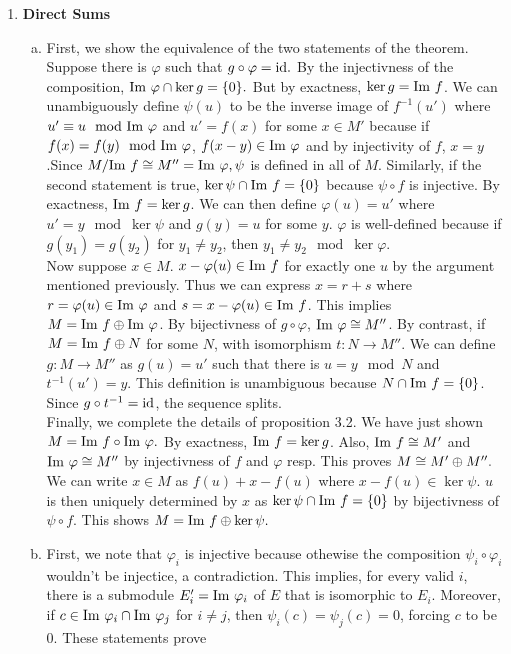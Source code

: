 \documentclass{article}
\theoremstyle{definition}
\theoremstyle{remark}
\begin{document}
\begin{enumerate}[(1)]
   
    \item  \textbf{Direct Sums}
    \begin{enumerate}[(a)]
        \item  First, we show the equivalence of the two statements of the theorem. Suppose there is $\varphi$ such that $g \circ \varphi = \text{id}.$ By the injectivness of the composition,  $\mathrm{Im}\  \varphi \cap \ker g  = \{0\}.$ But by exactness, $\ker g = \mathrm{Im}\  f$. We can unambiguously define $\psi(u)$ to be the inverse image of $f^{-1}(u')$ where $u' \equiv u \mod {\mathrm{Im}\ } \varphi$ and $u' = f(x)$ for some $x \in M'$ because if $f(x) = f(y) \mod {\mathrm{Im}\ } \varphi$, $f(x - y) \in \mathrm{Im}\  \varphi$ and by injectivity of $f$, $x = y$.Since $M/\mathrm{Im}\  f \cong M'' =  \mathrm{Im}\  \varphi, \psi$ is defined in all of $M$. Similarly, if the second statement is true, $\ker \psi \cap \mathrm{Im}\  f = \{0\}$ because $\psi\circ f$ is injective. By exactness, $\mathrm{Im}\  f = \ker g$. We can then define $\varphi(u) = u'$ where $u' = y \mod \ker \psi$ and $g(y) = u$ for some $y$. $\varphi$ is well-defined because if $g(y_1) = g(y_2)$ for $y_1 \neq y_2$, then $y_1 \neq y_2 \mod \ker \varphi$.\\
        
        Now suppose $x \in M$. $x - \varphi(u) \in \mathrm{Im}\  f$ for exactly one $u$ by the argument mentioned previously. Thus we can express $x = r + s$ where $r = \varphi(u) \in \mathrm{Im}\  \varphi$ and $s = x - \varphi(u) \in \mathrm{Im}\  f$. This implies $M = \mathrm{Im}\  f \oplus \mathrm{Im}\  \varphi$. By bijectivness of $g \circ \varphi$, $\mathrm{Im}\  \varphi \cong M''$. By contrast, if $M = \mathrm{Im}\  f \oplus N$ for some $N$, with isomorphism $t: N \to M''.$ We can define $g: M \to M''$ as $g(u) = u'$ such that there is $u = y \mod N$ and $t^{-1}(u') = y$. This definition is unambiguous because $N \cap \mathrm{Im}\  f = \{0\}$. Since $g \circ t^{-1} = \text{id}$, the sequence splits.\\



        Finally, we complete the details of proposition 3.2. We have just shown $M = \mathrm{Im}\  f \circ \mathrm{Im}\  \varphi.$ By exactness, $\mathrm{Im}\  f = \ker g$. Also, $\mathrm{Im}\  f \cong M'$ and $\mathrm{Im}\  \varphi \cong M''$ by injectivness of $f$ and $\varphi$ resp. This proves $M \cong M' \oplus M''.$ We can write $x \in M$ as $f(u) + x - f(u)$ where $x - f(u) \in \ker \psi$. $u$ is then uniquely determined by $x$ as $\ker \psi \cap \mathrm{Im}\  f = \{0\}$ by bijectivness of $\psi \circ f.$ This shows $M = \mathrm{Im}\  f \oplus \ker \psi.$

        \renewcommand{\phi}{\varphi}
        \item First, we note that $\phi_i$ is injective because othewise the composition $\psi_i \circ \phi_i$ wouldn't be injectice, a contradiction. This implies, for every valid $i$, there is a submodule $E'_i = \Img \phi_i$ of $E$ that is isomorphic to $E_i.$ Moreover, if $c \in \Img \phi_i \cap \Img \phi_j$ for $i\neq j$, then $\psi_i(c) = \psi_j(c) = 0$, forcing $c$ to be $0$. These statements prove
        

\end{enumerate}
\end{enumerate}
\end{document}
